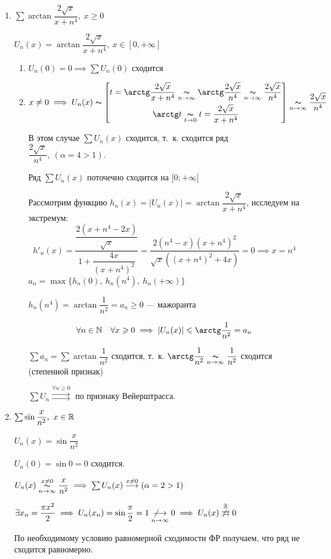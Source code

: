 \documentclass[../../main.tex]{subfiles}
\begin{document}
\begin{exmps}
	\;
	\begin{enumerate}
		\item $\sum \arctan\dfrac{2\sqrt{x}}{x+n^4},\ x \geq 0$

$U_n(x) = \arctan\dfrac{2\sqrt{x}}{x+n^4},\ x \in [0,+\infty]$
	\begin{enumerate}
		\item $U_n(0) = 0 \implies \sum U_n(0)$ сходится
		\item $x \neq 0 \implies U_n(x) \thicksim 
	\left[ \begin{gathered}
	t = \arctan\dfrac{2\sqrt{x}}{x+n^4} \underset{n \to \infty}{\thicksim} 
	\arctan\dfrac{2\sqrt{x}}{n^4} \underset{n \to \infty}{\thicksim}
	\dfrac{2\sqrt{x}}{n^4} \\
	\arctan t \underset{t \to 0}{\thicksim}
	t = \dfrac{2\sqrt{x}}{x+n^4}
	\end{gathered} \right] \underset{n \to \infty}{\thicksim}
	\dfrac{2\sqrt{x}}{n^4}$
	
	В этом случае $\sum U_n(x)$ сходится, т.~к. сходится ряд 
	$\dfrac{2\sqrt{x}}{n^4},\ (\alpha = 4 > 1)$.
	
	Ряд $\sum U_n(x)$ поточечно сходится на $[0;+\infty[$
	
	Рассмотрим функцию $h_n(x) = |U_n(x)| = \arctan\dfrac{2\sqrt{x}}{x+n^4}$, 
	исследуем на экстремум: \\
	\[
	h'_n(x) = \dfrac{\dfrac{2(x + n^4 - 2x)}{\sqrt{x}}}
	{1 + \dfrac{4x}{(x+n^4)^2}} = \dfrac{2(n^4-x)(x+n^4)^2}
	{\sqrt{x}((x+n^4)^2+4x)} = 0 \implies x = n^4
	\]
	$a_n = \max\{ h_n(0),\ h_n(n^4),\ h_n(+\infty) \}$
	
	$ h_n(n^4) = \arctan\dfrac{1}{n^2} = a_n \geq 0$ --- мажоранта
	
	\[
	\forall n \in \N \quad \forall x \geq 0 \implies |U_n(x)| \leq 
	\arctan\dfrac{1}{n^2} = a_n
	\]
	
	$\sum a_n = \sum \arctan\dfrac{1}{n^2}$ сходится, т.~к. 
	$\arctan\dfrac{1}{n^2} \underset{n \to \infty}{\thicksim}
	\dfrac{1}{n^2}$ сходится (степенной признак)
	
	$\sum U_n \overset{\forall n \geq 0}{\rightrightarrows}$ 
	по признаку Вейерштрасса.
	\end{enumerate}	

	\item $\sum \sin\dfrac{x}{n^2},\ x \in \mathbb{R}$ 	 
	
	$U_n(x) = \sin\dfrac{x}{n^2}$
	
	$U_n(0) = \sin0 = 0$ сходится.
	
	$U_n(x) \overset{x \neq 0}{\underset{n \to \infty}\thicksim} 
	\dfrac{x}{n^2} \implies \sum U_n(x) \overset{x \neq 0}{\longrightarrow}
	(\alpha = 2 > 1)$	
	
	$\exists x_n = \dfrac{\pi x^2}{2} \implies U_n(x_n) = 
	\sin\dfrac{\pi}{2} = 1 \underset{n \to \infty}
	{\not \longrightarrow} 0 \implies
	U_n(x) \overset{\mathbb{R}}{\not \rightrightarrows} 0$

	По необходимому условию равномерной сходимости ФР получаем, что ряд 
	не сходится равномерно.
	\end{enumerate}	
\end{exmps}	
\end{document}

